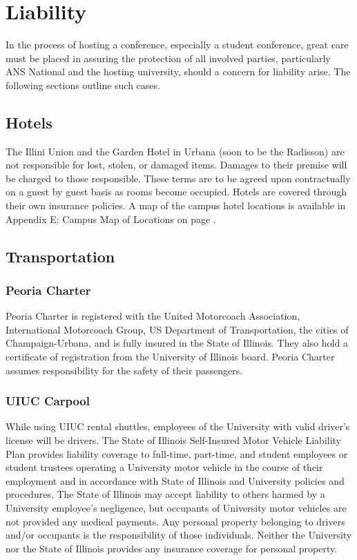 \section{Liability}
In the process of hosting a conference, especially a student conference, great care must be placed in assuring the protection of all involved parties, particularly ANS National and the hosting university,  should a concern for liability arise. The following sections outline such cases.



\subsection{Hotels}
The Illini Union and the Garden Hotel in Urbana (soon to be the Radisson) are not responsible for lost, stolen, or damaged items. Damages to their premise will be charged to those responsible. These terms are to be agreed upon contractually on a guest by guest basis as rooms become occupied. Hotels are covered through their own insurance policies. A map of the campus hotel locations is available in Appendix E: Campus Map of Locations on page \pageref{appendix:map}.



\subsection{Transportation}

\subsubsection{Peoria Charter}
Peoria Charter is registered with the United Motorcoach Association, International Motorcoach Group, US Department of Transportation, the cities of Champaign-Urbana, and is fully insured in the State of Illinois. They also hold a certificate of registration from the University of Illinois board. Peoria Charter assumes responsibility for the safety of their passengers.

\subsubsection{UIUC Carpool}
While using UIUC rental shuttles, employees of the University with valid driver’s license will be drivers. The State of Illinois Self-Insured Motor Vehicle Liability Plan provides liability coverage to full-time, part-time, and student employees or student trustees operating a University motor vehicle in the course of their employment and in accordance with State of Illinois and University policies and procedures. The State of Illinois may accept liability to others harmed by a University employee's negligence, but occupants of University motor vehicles are not provided any medical payments. Any personal property belonging to drivers and/or occupants is the responsibility of those individuals. Neither the University nor the State of Illinois provides any insurance coverage for personal property.


